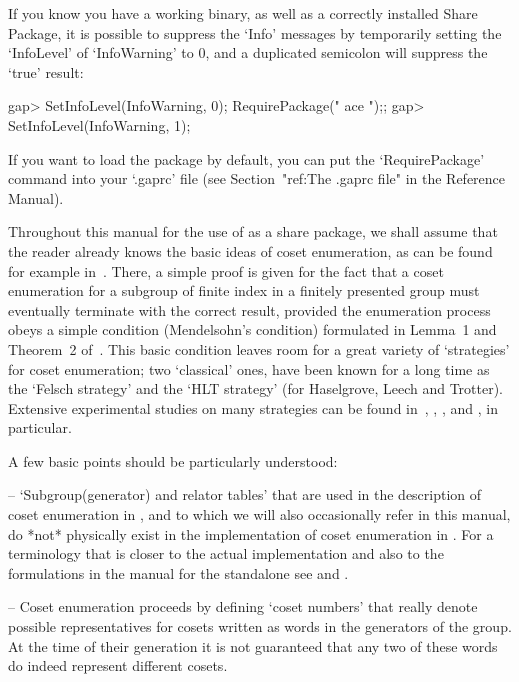 If you know you have a working {\ACE} binary, as well as  a  correctly
installed {\ACE} Share Package, it is possible to suppress the  `Info'
messages by temporarily setting the `InfoLevel' of `InfoWarning' to 0,
and a duplicated semicolon will suppress the `true' result:

\begintt
gap> SetInfoLevel(InfoWarning, 0); RequirePackage(" ace ");;
gap> SetInfoLevel(InfoWarning, 1);
\endtt

If you want to load the {\ACE} package by default, you  can  put   the
`RequirePackage' command into your `.gaprc' file (see Section~"ref:The
.gaprc file" in the {\GAP} Reference Manual).


Throughout this manual for  the  use  of  {\ACE}  as  a  {\GAP}  share
package, we shall assume that the reader already knows the basic ideas
of coset enumeration, as can be  found  for  example  in~\cite{Neu82}.
There, a simple proof is given for the fact that a  coset  enumeration
for a subgroup of finite index in  a  finitely  presented  group  must
eventually terminate with the correct result, provided the enumeration
process obeys a simple condition (Mendelsohn's  condition)  formulated
in Lemma~1 and Theorem~2 of~\cite{Neu82}. This basic condition  leaves
room for a great variety of \lq{}strategies'  for  coset  enumeration;
two \lq{}classical' ones, have been known  for  a  long  time  as  the
\lq{}Felsch strategy' and  the  \lq{}HLT  strategy'  (for  Haselgrove,
Leech and Trotter). Extensive experimental studies on many  strategies
can  be  found  in~\cite{CDHW73},  \cite{Hav91},   \cite{HR99a},   and
\cite{HR99b}, in particular.

A few basic points should be particularly understood:

\beginlist

\item{--} \lq{}Subgroup(generator) and relator tables' that  are  used
in the description of coset enumeration in \cite{Neu82}, and to  which
we will also occasionally refer in this manual,  do  *not*  physically
exist in the implementation of coset  enumeration  in  {\ACE}.  For  a
terminology that is closer to the actual implementation  and  also  to
the  formulations  in  the  manual  for  the  {\ACE}  standalone   see
\cite{CDHW73} and \cite{Hav91}.

\item{--} Coset enumeration proceeds by defining  \lq{}coset  numbers'
that really denote possible  representatives  for  cosets  written  as
words in the generators of the group. At the time of their  generation
it is not guaranteed that any two of these words do  indeed  represent
different cosets.

